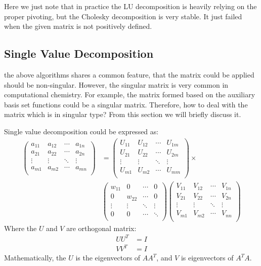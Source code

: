 Here we just note that in practice the LU decomposition is heavily relying on the proper pivoting,
but the Cholesky decomposition is very stable. It just failed when the given matrix is not 
positively defined.

\subsection{Single Value Decomposition}
%
%
%
the above algorithms shares a common feature, that the matrix could be applied should be 
non-singular. However, the singular matrix is very common in computational chemistry. 
For example, the matrix formed based on the auxiliary basis set functions could be a 
singular matrix. Therefore, how to deal with the matrix which is in singular type? From
this section we will briefly discuss it.

Single value decomposition could be expressed as:
\begin{align}
 \label{Solution_Linear_Equations_eq:6}
 \begin{pmatrix}
a_{11}  &  a_{12}  & \cdots  & a_{1n} \\ 
a_{21}  &  a_{22}  & \cdots  & a_{2n} \\ 
\vdots  &  \vdots  & \ddots  & \vdots \\ 
a_{m1}  &  a_{m2}  & \cdots  & a_{mn} \\ 
\end{pmatrix} 
&= 
\begin{pmatrix}
U_{11}  &  U_{12}  & \cdots  & U_{1m} \\ 
U_{21}  &  U_{22}  & \cdots  & U_{2m} \\ 
\vdots  &  \vdots  & \ddots  & \vdots \\ 
U_{m1}  &  U_{m2}  & \cdots  & U_{mm} \\ 
\end{pmatrix} \times \\ \nonumber 
&
\begin{pmatrix}
w_{11}  &  0       & \cdots  & 0      \\ 
0       &  w_{22}  & \cdots  & 0      \\ 
\vdots  &  \vdots  & \ddots  & \vdots \\ 
0       &  0       & \cdots  & \ddots \\ 
\end{pmatrix}
\begin{pmatrix}
V_{11}  &  V_{12}  & \cdots  & V_{1n} \\ 
V_{21}  &  V_{22}  & \cdots  & V_{2n} \\ 
\vdots  &  \vdots  & \ddots  & \vdots \\ 
V_{m1}  &  V_{m2}  & \cdots  & V_{nn} \\ 
\end{pmatrix}
\end{align} 
Where the $U$ and $V$ are orthogonal matrix:
\begin{align}
 \label{Solution_Linear_Equations_eq:7}
 UU^{T} &= I \nonumber \\
 VV^{T} &= I
\end{align}
Mathematically, the $U$ is the eigenvectors of $AA^{T}$,
and $V$ is eigenvectors of $A^{T}A$. 

